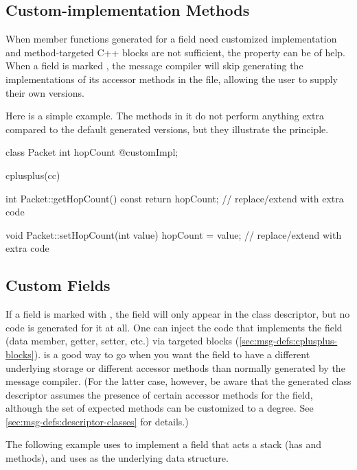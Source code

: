 

\subsection{Custom-implementation Methods}
\label{sec:msg-defs:customimpl-fields}

When member functions generated for a field need customized implementation and
method-targeted C++ blocks are not sufficient, the  property
can be of help. When a field is marked , the message compiler
will skip generating the implementations of its accessor methods in the  file,
allowing the user to supply their own versions.

Here is a simple example. The methods in it do not perform anything extra
compared to the default generated versions, but they illustrate the principle.

\begin{msg}
class Packet
{
    int hopCount @customImpl;
}

cplusplus(cc) {{
int Packet::getHopCount() const
{
    return hopCount; // replace/extend with extra code
}

void Packet::setHopCount(int value)
{
    hopCount = value; // replace/extend with extra code
}
}}
\end{msg}


\subsection{Custom Fields}
\label{sec:msg-defs:custom-fields}

If a field is marked with , the field will only appear in the
class descriptor, but no code is generated for it at all. One can inject the
code that implements the field (data member, getter, setter, etc.) via targeted
 blocks (\ref{sec:msg-defs:cplusplus-blocks}).
 is a good way to go when you want the field to have a different
underlying storage or different accessor methods than normally generated by the
message compiler. (For the latter case, however, be aware that the generated
class descriptor assumes the presence of certain accessor methods for the
field, although the set of expected methods can be customized to a degree. See
\ref{sec:msg-defs:descriptor-classes} for details.)

The following example uses  to implement a field that acts a
stack (has  and  methods), and uses  as
the underlying data structure.

